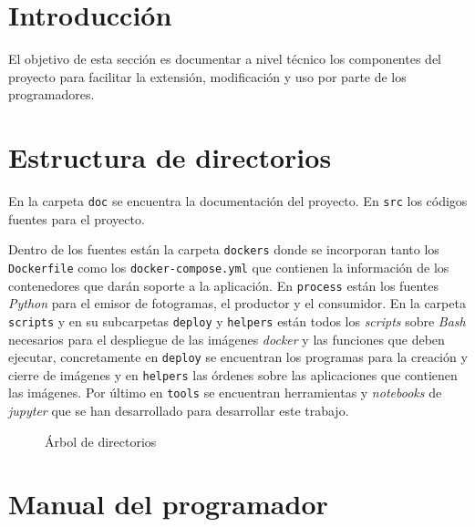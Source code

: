 
\section{Introducción}

El objetivo de esta sección es documentar a nivel técnico los componentes del proyecto para facilitar la extensión, modificación y uso por parte de los programadores.

\section{Estructura de directorios}

En la carpeta \texttt{doc} se encuentra la documentación del proyecto. En \texttt{src} los códigos fuentes para el proyecto.

Dentro de los fuentes están la carpeta \texttt{dockers} donde se incorporan tanto los \texttt{Dockerfile} como los \texttt{docker-compose.yml} que contienen la información de los contenedores que darán soporte a la aplicación. En \texttt{process} están los fuentes \textit{Python} para el emisor de fotogramas, el productor y el consumidor. En la carpeta \texttt{scripts} y en su subcarpetas \texttt{deploy} y \texttt{helpers} están todos los \textit{scripts} sobre \textit{Bash} necesarios para el despliegue de las imágenes \textit{docker} y las funciones que deben ejecutar, concretamente en \texttt{deploy} se encuentran los programas para la creación y cierre de imágenes y en \texttt{helpers} las órdenes sobre las aplicaciones que contienen las imágenes. Por último en \texttt{tools} se encuentran herramientas y \textit{notebooks} de \textit{jupyter} que se han desarrollado para desarrollar este trabajo.

\begin{figure}
	\caption{Árbol de directorios}
	\label{fig:dirtree}
\end{figure}

\section{Manual del programador}\label{sec:manualpro}

